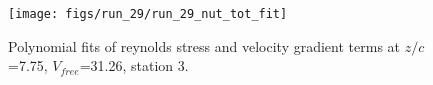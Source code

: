 \begin{figure}[H]
\centering
\texttt{[image: figs/run\_29/run\_29\_nut\_tot\_fit]}
\caption{Polynomial fits of reynolds stress and velocity gradient terms at $z/c$=7.75, $V_{free}$=31.26, station 3.}
\label{fig:run_29_nut_tot_fit}
\end{figure}


